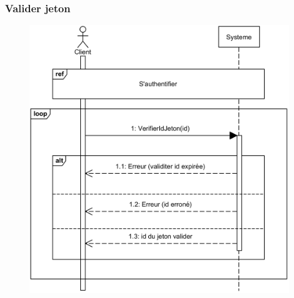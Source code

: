     \subsubsection[Valider jeton]{Valider jeton}
        \begin{figure}[H]
            \centering
            \includegraphics[width=130mm]{images/sd-valider-jeton.png}
            \label{fig:sdValiderJeton}
        \end{figure}
\pagebreak
